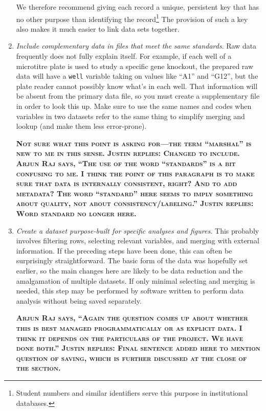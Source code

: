 \documentclass[10pt]{article}
\newcommand{\fixme}[1]{\textsc{\textbf{#1}}}
\newcommand{\recommend}[1]{\textit{#1}}
\begin{document}
\begin{enumerate}
  We therefore recommend giving each record a unique, persistent key
  that has no other purpose than identifying the record\footnote{Student
    numbers and similar identifiers serve this purpose in institutional
    databases.} The provision of such a key also makes it much easier to
  link data sets together.

\item
  \recommend{Include complementary data in files that meet the same
    standards}.  Raw data frequently does not fully explain
  itself. For example, if each well of a microtitre plate is used to
  study a specific gene knockout, the prepared raw data will have a
  \texttt{well} variable taking on values like ``A1'' and ``G12'', but
  the plate reader cannot possibly know what's in each well. That
  information will be absent from the primary data file, so you must
  create a supplementary file in order to look this up. Make sure to
  use the same names and codes when variables in two datasets refer to
  the same thing to simplify merging and lookup (and make them less
  error-prone).

  \fixme{Not sure what this point is asking for---the
    term ``marshal'' is new to me in this sense. Justin replies: Changed to include. Arjun Raj says,
    ``The use of the word ``standards'' is a bit confusing to me.  I
    think the point of this paragraph is to make sure that data is
    internally consistent, right?  And to add metadata?  The word
    ``standard'' here seems to imply something about quality, not
    about consistency/labeling.'' Justin replies: Word standard no longer here.}

\item
  \recommend{Create a dataset purpose-built for specific analyses and
    figures.}  This probably involves filtering rows, selecting
  relevant variables, and merging with external information. If the
  preceding steps have been done, this can often be surprisingly
  straightforward. The basic form of the data was hopefully set
  earlier, so the main changes here are likely to be data reduction
  and the amalgamation of multiple datasets.
  If only minimal selecting and merging is needed,
  this step may be performed by software written to perform data analysis
  without being saved separately.

  \fixme{Arjun Raj says,
    ``Again the question comes up about whether this is best managed
    programmatically or as explicit data.  I think it depends on the
    particulars of the project.  We have done both.'' Justin replies: Final sentence added here to mention question of saving, which is further discussed at the close of the section.}


\end{enumerate}
\end{document}

